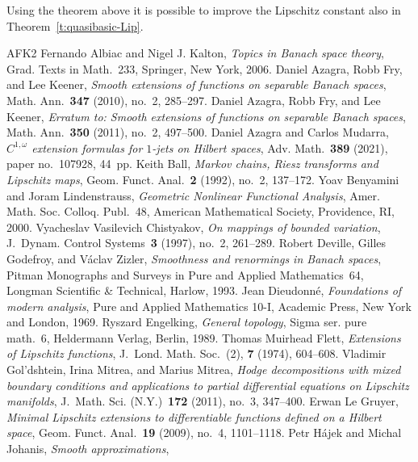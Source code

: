 \documentclass[a4paper,twoside,10pt,reqno,draft]{amsart}
\theoremstyle{definition}
\theoremstyle{remark}
\newcommand\om{\omega}
\begin{document}
Using the theorem above it is possible to improve the Lipschitz constant also in Theorem~\ref{t:quasibasic-Lip}.

\begin{thebibliography}{AFK2}
Fernando Albiac and Nigel J. Kalton,
\emph{Topics in Banach space theory},
Grad. Texts in Math.~233, Springer, New York, 2006.
%
Daniel Azagra, Robb Fry, and Lee Keener,
\emph{Smooth extensions of functions on separable Banach spaces},
Math. Ann.~\textbf{347} (2010), no.~2, 285--297.
%
Daniel Azagra, Robb Fry, and Lee Keener,
\emph{Erratum to: Smooth extensions of functions on separable Banach spaces},
Math. Ann.~\textbf{350} (2011), no.~2, 497--500.
%
Daniel Azagra and Carlos Mudarra,
\emph{$C^{1,\om}$ extension formulas for $1$-jets on Hilbert spaces},
Adv. Math.~\textbf{389} (2021), paper no.~107928, 44~pp.
%
Keith Ball,
\emph{Markov chains, Riesz transforms and Lipschitz maps},
Geom. Funct. Anal.~\textbf{2} (1992), no.~2, 137--172.
%
Yoav Benyamini and Joram Lindenstrauss,
\emph{Geometric Nonlinear Functional Analysis},
Amer. Math. Soc. Colloq. Publ.~48, American Mathematical Society, Providence, RI, 2000.
%
Vyacheslav Vasilevich Chistyakov,
\emph{On mappings of bounded variation},
J.~Dynam. Control Systems~\textbf{3} (1997), no.~2, 261--289.
%
Robert Deville, Gilles Godefroy, and Václav Zizler,
\emph{Smoothness and renormings in Banach spaces},
Pitman Monographs and Surveys in Pure and Applied Mathematics~64, Longman Scientific \& Technical, Harlow, 1993.
%
Jean Dieudonné,
\emph{Foundations of modern analysis},
Pure and Applied Mathematics 10-I, Academic Press, New York and London, 1969.
%
Ryszard Engelking,
\emph{General topology},
Sigma ser. pure math.~6, Heldermann Verlag, Berlin, 1989.
%
Thomas Muirhead Flett,
\emph{Extensions of Lipschitz functions},
J.~Lond. Math. Soc.~(2), \textbf{7} (1974), 604--608.
%
Vladimir Gol'dshtein, Irina Mitrea, and Marius Mitrea,
\emph{Hodge decompositions with mixed boundary conditions and applications to partial differential equations on Lipschitz manifolds},
J.~Math. Sci. (N.Y.)~\textbf{172} (2011), no.~3, 347--400.
%
Erwan Le Gruyer,
\emph{Minimal Lipschitz extensions to differentiable functions defined on a Hilbert space},
Geom. Funct. Anal.~\textbf{19} (2009), no.~4, 1101--1118.
%
Petr Hájek and Michal Johanis,
\emph{Smooth approximations},

\end{thebibliography}
\end{document}
